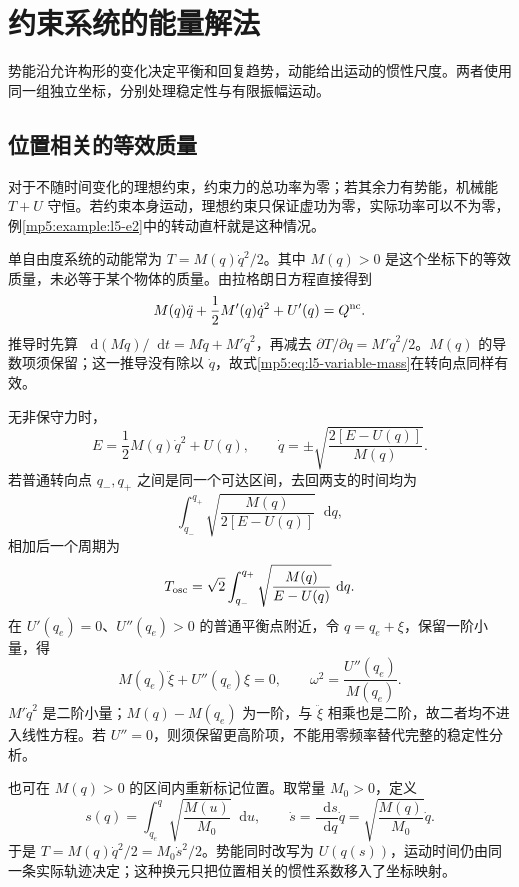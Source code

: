 \documentclass[11pt,openany,fontset=fandol]{ctexbook}
\theoremstyle{definition}\newtheorem{example}{例}[chapter]\newtheorem{exercise}{习题}[chapter]
\newcommand{\dd}{\mathop{}\!\mathrm d}\newcommand{\ee}{\mathrm e}\newcommand{\vct}[1]{\bm{#1}}
\begin{document}
\section{约束系统的能量解法}
势能沿允许构形的变化决定平衡和回复趋势，动能给出运动的惯性尺度。两者使用同一组独立坐标，分别处理稳定性与有限振幅运动。

\subsection{位置相关的等效质量}
对于不随时间变化的理想约束，约束力的总功率为零；若其余力有势能，机械能 $T+U$ 守恒。若约束本身运动，理想约束只保证虚功为零，实际功率可以不为零，例\ref{mp5:example:l5-e2}中的转动直杆就是这种情况。

单自由度系统的动能常为 $T=M(q)\dot q^2/2$。其中 $M(q)>0$ 是这个坐标下的等效质量，未必等于某个物体的质量。由拉格朗日方程直接得到
\begin{equation}\label{mp5:eq:l5-variable-mass}
M(q)\ddot q+\frac12M'(q)\dot q^2+U'(q)=Q^{\rm nc}.
\end{equation}
推导时先算 $\dd(M\dot q)/\dd t=M\ddot q+M'\dot q^2$，再减去 $\partial T/\partial q=M'\dot q^2/2$。$M(q)$ 的导数项须保留；这一推导没有除以 $\dot q$，故式\eqref{mp5:eq:l5-variable-mass}在转向点同样有效。

无非保守力时，
\[
E=\frac12M(q)\dot q^2+U(q),\qquad
\dot q=\pm\sqrt{\frac{2[E-U(q)]}{M(q)}}.
\]
若普通转向点 $q_-,q_+$ 之间是同一个可达区间，去回两支的时间均为
\[
\int_{q_-}^{q_+}\sqrt{\frac{M(q)}{2[E-U(q)]}}\dd q,
\]
相加后一个周期为
\begin{equation}\label{mp5:eq:l5-period}
T_{\rm osc}=\sqrt2\int_{q_-}^{q_+}\sqrt{\frac{M(q)}{E-U(q)}}\,\dd q.
\end{equation}
在 $U'(q_e)=0$、$U''(q_e)>0$ 的普通平衡点附近，令 $q=q_e+\xi$，保留一阶小量，得
\begin{equation}\label{mp5:eq:l5-small}
M(q_e)\ddot\xi+U''(q_e)\xi=0,
\qquad \omega^2=\frac{U''(q_e)}{M(q_e)}.
\end{equation}
$M'\dot q^2$ 是二阶小量；$M(q)-M(q_e)$ 为一阶，与 $\ddot\xi$ 相乘也是二阶，故二者均不进入线性方程。若 $U''=0$，则须保留更高阶项，不能用零频率替代完整的稳定性分析。

也可在 $M(q)>0$ 的区间内重新标记位置。取常量 $M_0>0$，定义
\[
s(q)=\int_{q_e}^q\sqrt{\frac{M(u)}{M_0}}\dd u,
\qquad
\dot s=\frac{\dd s}{\dd q}\dot q
=\sqrt{\frac{M(q)}{M_0}}\dot q.
\]
于是 $T=M(q)\dot q^2/2=M_0\dot s^2/2$。势能同时改写为 $U(q(s))$，运动时间仍由同一条实际轨迹决定；这种换元只把位置相关的惯性系数移入了坐标映射。
\end{document}
